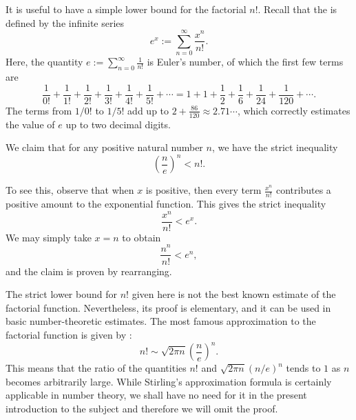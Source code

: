 \begin{remark}\label{theorem:elementary-estimate-factorial}
  It is useful to have a simple lower bound for the factorial $n!$. Recall that the  is defined by the infinite series
  \begin{equation*}
    e^x := \sum_{n=0}^\infty \frac{x^n}{n!}.
  \end{equation*}
  Here, the quantity $e:=\sum_{n=0}^\infty \frac{1}{n!}$ is Euler's number, of which the first few terms are
  \begin{equation*}
    \frac{1}{0!}+\frac{1}{1!}+\frac{1}{2!}+\frac{1}{3!}+\frac{1}{4!}+\frac{1}{5!} + \cdots = 1+1+\frac{1}{2}+\frac{1}{6}+\frac{1}{24}+\frac{1}{120}+\cdots.
  \end{equation*}
  The terms from $1/0!$ to $1/5!$ add up to $2+\frac{86}{120}\approx 2.71\cdots$, which correctly estimates the value of $e$ up to two decimal digits.
  
  We claim that for any positive natural number $n$, we have the strict inequality
  \begin{equation*}
    \left(\frac{n}{e}\right)^n<n!.
  \end{equation*}
  
  To see this, observe that when $x$ is positive, then every term $\frac{x^n}{n!}$ contributes a positive amount to the exponential function. This gives the strict inequality
  \begin{equation*}
    \frac{x^n}{n!}<e^x.
  \end{equation*}
  We may simply take $x=n$ to obtain
  \begin{equation*}
    \frac{n^n}{n!}<e^n,
  \end{equation*}
  and the claim is proven by rearranging.
  
  The strict lower bound for $n!$ given here is not the best known estimate of the factorial function. Nevertheless, its proof is elementary, and it can be used in basic number-theoretic estimates. The most famous approximation to the factorial function is given by :
  \begin{equation*}
    n!\sim \sqrt{2\pi n}\left(\frac{n}{e}\right)^n.
  \end{equation*}
  This means that the ratio of the quantities $n!$ and $\sqrt{2\pi n}(n/e)^n$ tends to $1$ as $n$ becomes arbitrarily large. While Stirling's approximation formula is certainly applicable in number theory, we shall have no need for it in the present introduction to the subject and therefore we will omit the proof.
\end{remark}

